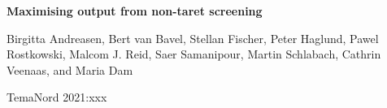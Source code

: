 \begin{titlepage}

\vspace*{7cm}

{\Huge\bfseries Maximising output from non-taret screening\par}

\vspace{1.5cm}
  
{\normalsize Birgitta Andreasen, Bert van Bavel, Stellan Fischer, Peter Haglund, Pawel Rostkowski, Malcom J. Reid, Saer Samanipour, Martin Schlabach, Cathrin Veenaas, and Maria Dam\par}

\vfill

{\large TemaNord 2021:xxx\par}

\vspace*{2cm}

\end{titlepage}